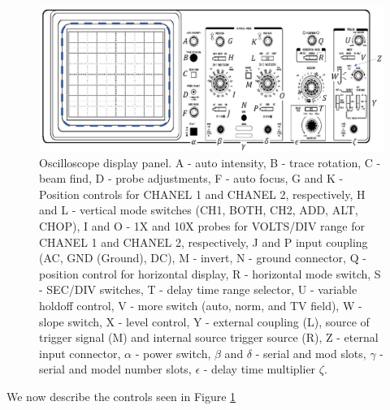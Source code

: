 \begin{figure}[H]
    \centering
    \includegraphics[scale = 0.8]{Images/ACDC6.PNG}
    \caption{Oscilloscope display panel. A - auto intensity, B - trace rotation, C - beam find, D - probe adjustments, F - auto focus, G and K - Position controls for CHANEL 1 and CHANEL 2, respectively, H and L - vertical mode switches (CH1, BOTH, CH2, ADD, ALT, CHOP), I and O - 1X and 10X probes for VOLTS/DIV range for CHANEL 1 and CHANEL 2, respectively, J and P input coupling (AC, GND (Ground), DC), M - invert, N - ground connector, Q - position control for horizontal display, R - horizontal mode switch, S - SEC/DIV switches, T - delay time range selector, U - variable holdoff control, V - more switch (auto, norm, and TV field), W - slope switch, X - level control, Y - external coupling (L), source of trigger signal (M) and internal source trigger source (R), Z - eternal input connector, $\alpha$ - power switch, $\beta$ and $\delta$ - serial and mod slots, $\gamma$ - serial and model number slots, $\epsilon$ - delay time multiplier $\zeta$.}
    \label{fig:ACDC6}
\end{figure}

We now describe the controls seen in Figure \ref{fig:ACDC6}

